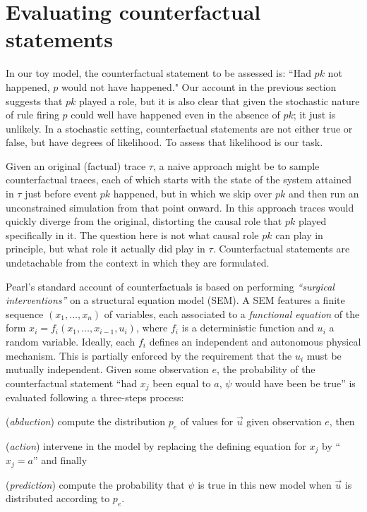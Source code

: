 
\newcommand{\PCFST}[0]{\ProbParen{\CFST{}}}

\newcommand{\ItAbduction}[0]{(\textit{abduction})}
\newcommand{\ItAction}[0]{(\textit{action})}
\newcommand{\ItPrediction}[0]{(\textit{prediction})}


\section{Evaluating counterfactual
  statements}\label{sec:counterfactual}

In our toy model, the counterfactual statement to be
assessed is: ``Had $pk$ not happened, $p$ would not have happened."
Our account in the previous section suggests that $pk$ played a role,
but it is also clear that given the stochastic nature of rule firing
$p$ could well have happened even in the absence of $pk$; it just is
unlikely. In a stochastic setting, counterfactual statements are not
either true or false, but have degrees of likelihood. To assess that
likelihood is our task.

Given an original (factual) trace $\tau$, a naive approach might be to sample
counterfactual traces, each of which starts with the state of the system
attained in $\tau$ just before event $pk$ happened, but in which we skip over
$pk$ and then run an unconstrained simulation from that point onward. In this
approach traces would quickly diverge from the original, distorting the causal
role that $pk$ played specifically in it. The question here is not what causal
role $pk$ can play in principle, but what role it actually did play in $\tau$.
Counterfactual statements are undetachable from the context in which they are
formulated.

Pearl's standard account \cite{pearl2009causality} of counterfactuals
is based on performing \textit{``surgical interventions''} on a
structural equation model (SEM). A SEM features a finite sequence
$(x_1, \dots, x_n)$ of variables, each associated to a
\emph{functional equation} of the form
$x_i = f_i(x_1, \dots, x_{i-1}, u_i)$, where $f_i$ is a deterministic
function and $u_i$ a random variable. Ideally, each $f_i$ defines an
independent and autonomous physical mechanism. This is partially
enforced by the requirement that the $u_i$ must be mutually
independent. Given some observation $e$, the probability of the
counterfactual statement ``had $x_j$ been equal to $a$, $\psi$ would
have been be true'' is evaluated following a three-steps process:
\begin{inparaenum}[]
\item \ItAbduction{} compute the distribution $p_e$ of values for
  $\vec u$ given observation $e$, then
\item \ItAction{} intervene in the model by replacing the defining
  equation for $x_j$ by ``$x_j = a$'' and finally
\item \ItPrediction{} compute the probability that $\psi$ is true in
  this new model when $\vec{u}$ is distributed according to $p_e$.
\end{inparaenum}

